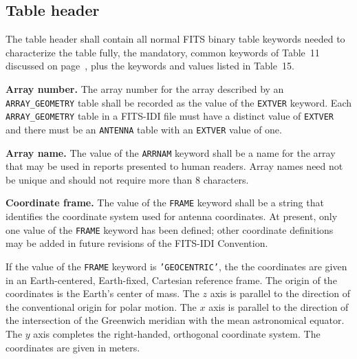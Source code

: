 \documentclass[twoside]{article}
\newcommand{\Hi}[1]{\textcolor{hicol}{#1}}
\begin{document}
\subsection{Table header}

\Hi{The table header shall contain all normal FITS binary table
keywords needed to characterize the table fully, the mandatory, common
keywords of Table~11 discussed on page~\pageref{ta:keywords}, plus the
keywords and values listed in Table~\Hi{15}.}

{\bf Array number.} The array number for the array described by an
{\tt ARRAY\_GEOMETRY} \Hi{table} shall be recorded as the value of the
{\tt EXTVER} keyword.  Each {\tt ARRAY\_GEOMETRY} table in a FITS-IDI
file must have a distinct value of {\tt EXTVER} and there must be an
{\tt ANTENNA} table with an {\tt EXTVER} value of one.

{\bf Array name.}  The value of the {\tt ARRNAM} keyword shall be a
name for the array that may be used in reports presented to human
readers.  Array names need not be unique and \Hi{should not require
more} than 8 characters.

{\bf Coordinate frame.} The value of the {\tt FRAME} keyword shall be a
string that identifies the coordinate system used for antenna
coordinates.  \Hi{At present, only one value of the {\tt FRAME}
keyword has been defined;} other coordinate definitions may be added
in future revisions of the FITS-IDI \Hi{Convention}.

If the value of the {\tt FRAME} keyword is {\tt 'GEOCENTRIC'}, the the
coordinates are given in an Earth-centered, Earth-fixed, Cartesian
reference frame.  The origin of the coordinates is the Earth's center
of mass.  The $z$ axis is parallel to the direction of the
conventional origin for polar motion.  The $x$ axis is parallel to the
direction of the intersection of the Greenwich meridian with the mean
astronomical equator.  The $y$ axis completes the right-handed,
orthogonal coordinate system.  The coordinates are given in meters.
\end{document}
